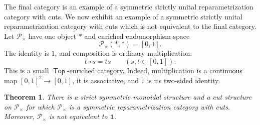 \documentclass[12pt,a4paper]{amsart}
\newcommand{\Top}{\mathop{\mathsf{Top}}}
\newcommand{\Pcat}{\mathcal P}
\newcommand{\One}{\mathbf 1}
\newcommand{\Pmult}{\Pcat_{\times}}
\newtheorem{thm}{Theorem}[section]
\theoremstyle{definition}
\begin{document}
The final category is an example of a symmetric strictly unital reparametrization category with cuts. We now exhibit an example of a symmetric strictly unital reparametrization category with cuts which is not equivalent to the final category. Let \(\Pmult\) have one object \(*\) and enriched endomorphism space
\[
\Pmult(*,*)=[0,1].
\]
The identity is \(1\), and composition is ordinary multiplication:
\[
t\circ s=ts \qquad (s,t\in[0,1]).
\]
This is a small \(\Top\)-enriched category.  Indeed, multiplication is a continuous map \([0,1]^2\to[0,1]\), it is associative, and \(1\) is its two-sided identity.

\begin{thm}\label{thm:example}
	There is a strict symmetric monoidal structure and a cut structure on \(\Pmult\) for which \(\Pmult\) is a symmetric reparametrization category with cuts.  Moreover, \(\Pmult\) is not equivalent to \(\One\).
\end{thm}
\end{document}
